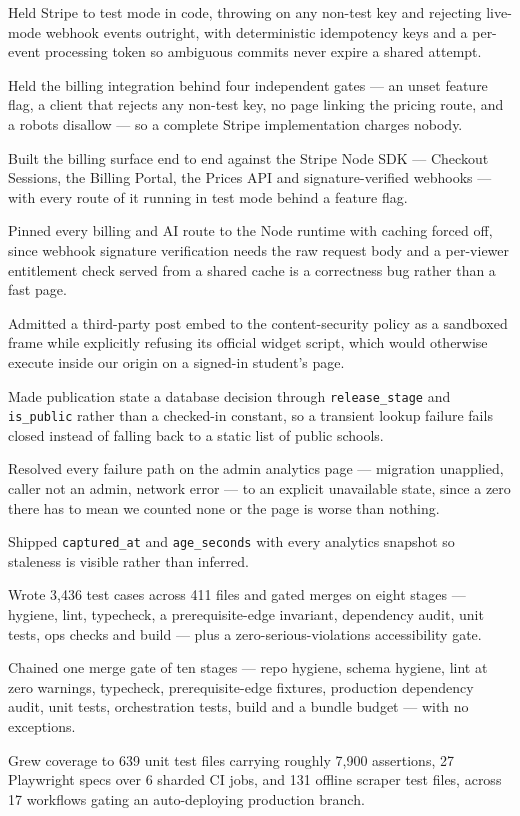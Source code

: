 \documentclass[letterpaper,11pt]{article}
\newcommand{\resumeItem}[1]{
  \item\small{
    {#1 \vspace{-2pt}}
  }
}
\begin{document}
            \resumeItem{Held Stripe to test mode in code, throwing on any non-test key and rejecting live-mode webhook events outright, with deterministic idempotency keys and a per-event processing token so ambiguous commits never expire a shared attempt.}
            \resumeItem{Held the billing integration behind four independent gates --- an unset feature flag, a client that rejects any non-test key, no page linking the pricing route, and a robots disallow --- so a complete Stripe implementation charges nobody.}
            \resumeItem{Built the billing surface end to end against the Stripe Node SDK --- Checkout Sessions, the Billing Portal, the Prices API and signature-verified webhooks --- with every route of it running in test mode behind a feature flag.}
            \resumeItem{Pinned every billing and AI route to the Node runtime with caching forced off, since webhook signature verification needs the raw request body and a per-viewer entitlement check served from a shared cache is a correctness bug rather than a fast page.}
            \resumeItem{Admitted a third-party post embed to the content-security policy as a sandboxed frame while explicitly refusing its official widget script, which would otherwise execute inside our origin on a signed-in student's page.}
            \resumeItem{Made publication state a database decision through \texttt{release\_stage} and \texttt{is\_public} rather than a checked-in constant, so a transient lookup failure fails closed instead of falling back to a static list of public schools.}
            \resumeItem{Resolved every failure path on the admin analytics page --- migration unapplied, caller not an admin, network error --- to an explicit unavailable state, since a zero there has to mean we counted none or the page is worse than nothing.}
            \resumeItem{Shipped \texttt{captured\_at} and \texttt{age\_seconds} with every analytics snapshot so staleness is visible rather than inferred.}
            \resumeItem{Wrote 3,436 test cases across 411 files and gated merges on eight stages --- hygiene, lint, typecheck, a prerequisite-edge invariant, dependency audit, unit tests, ops checks and build --- plus a zero-serious-violations accessibility gate.}
            \resumeItem{Chained one merge gate of ten stages --- repo hygiene, schema hygiene, lint at zero warnings, typecheck, prerequisite-edge fixtures, production dependency audit, unit tests, orchestration tests, build and a bundle budget --- with no exceptions.}
            \resumeItem{Grew coverage to 639 unit test files carrying roughly 7,900 assertions, 27 Playwright specs over 6 sharded CI jobs, and 131 offline scraper test files, across 17 workflows gating an auto-deploying production branch.}
\end{document}
